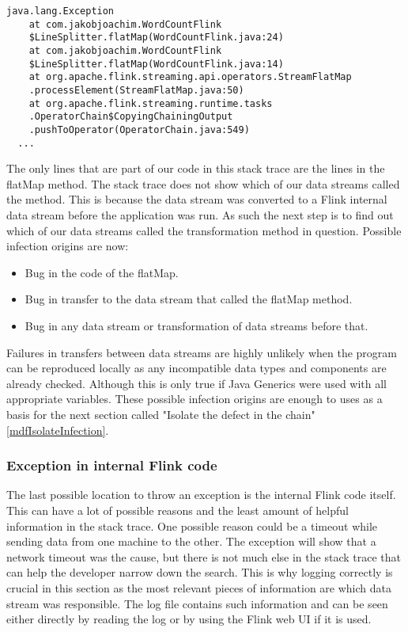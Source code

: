 \begin{lstlisting}[caption={Exception in Transformation}]
java.lang.Exception
    at com.jakobjoachim.WordCountFlink
    $LineSplitter.flatMap(WordCountFlink.java:24)
    at com.jakobjoachim.WordCountFlink
    $LineSplitter.flatMap(WordCountFlink.java:14)
    at org.apache.flink.streaming.api.operators.StreamFlatMap
    .processElement(StreamFlatMap.java:50)
    at org.apache.flink.streaming.runtime.tasks
    .OperatorChain$CopyingChainingOutput
    .pushToOperator(OperatorChain.java:549)
  ...
\end{lstlisting}

The only lines that are part of our code in this stack trace are the lines in the flatMap method. The stack trace does not show which of our data streams called the method. This is because the data stream was converted to a Flink internal data stream before the application was run. As such the next step is to find out which of our data streams called the transformation method in question. Possible infection origins are now:

\begin{itemize}
  \item Bug in the code of the flatMap.
  \item Bug in transfer to the data stream that called the flatMap method.
  \item Bug in any data stream or transformation of data streams before that.
\end{itemize}

Failures in transfers between data streams are highly unlikely when the program can be reproduced locally as any incompatible data types and components are already checked. Although this is only true if Java Generics were used with all appropriate variables. These possible infection origins are enough to uses as a basis for the next section called "Isolate the defect in the chain" \ref{mdfIsolateInfection}.

\subsubsection{Exception in internal Flink code}
The last possible location to throw an exception is the internal Flink code itself. This can have a lot of possible reasons and the least amount of helpful information in the stack trace. One possible reason could be a timeout while sending data from one machine to the other. The exception will show that a network timeout was the cause, but there is not much else in the stack trace that can help the developer narrow down the search. This is why logging correctly is crucial in this section as the most relevant pieces of information are which data stream was responsible. The log file contains such information and can be seen either directly by reading the log or by using the Flink web UI if it is used.

